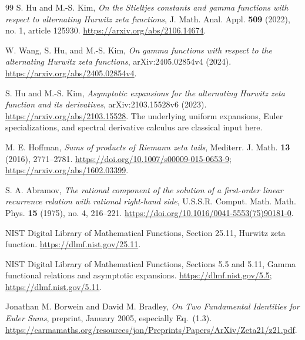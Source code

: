 \begin{thebibliography}{99}
S. Hu and M.-S. Kim,
\emph{On the Stieltjes constants and gamma functions with respect to
alternating Hurwitz zeta functions},
J. Math. Anal. Appl. \textbf{509} (2022), no. 1, article 125930.
\url{https://arxiv.org/abs/2106.14674}.

W. Wang, S. Hu, and M.-S. Kim,
\emph{On gamma functions with respect to the alternating Hurwitz zeta
functions}, arXiv:2405.02854v4 (2024).
\url{https://arxiv.org/abs/2405.02854v4}.

S. Hu and M.-S. Kim,
\emph{Asymptotic expansions for the alternating Hurwitz zeta function
and its derivatives}, arXiv:2103.15528v6 (2023).
\url{https://arxiv.org/abs/2103.15528}.
The underlying uniform expansions, Euler specializations, and
spectral derivative calculus are classical input here.

M. E. Hoffman,
\emph{Sums of products of Riemann zeta tails},
Mediterr. J. Math. \textbf{13} (2016), 2771--2781.
\url{https://doi.org/10.1007/s00009-015-0653-9};
\url{https://arxiv.org/abs/1602.03399}.

S. A. Abramov,
\emph{The rational component of the solution of a first-order linear
recurrence relation with rational right-hand side},
U.S.S.R. Comput. Math. Math. Phys. \textbf{15} (1975), no. 4,
216--221.
\url{https://doi.org/10.1016/0041-5553(75)90181-0}.

NIST Digital Library of Mathematical Functions, Section 25.11,
Hurwitz zeta function.
\url{https://dlmf.nist.gov/25.11}.

NIST Digital Library of Mathematical Functions, Sections 5.5 and 5.11,
Gamma functional relations and asymptotic expansions.
\url{https://dlmf.nist.gov/5.5};
\url{https://dlmf.nist.gov/5.11}.

Jonathan M. Borwein and David M. Bradley,
\emph{On Two Fundamental Identities for Euler Sums},
preprint, January 2005, especially Eq.~(1.3).
\url{https://carmamaths.org/resources/jon/Preprints/Papers/ArXiv/Zeta21/z21.pdf}.

\end{thebibliography}
